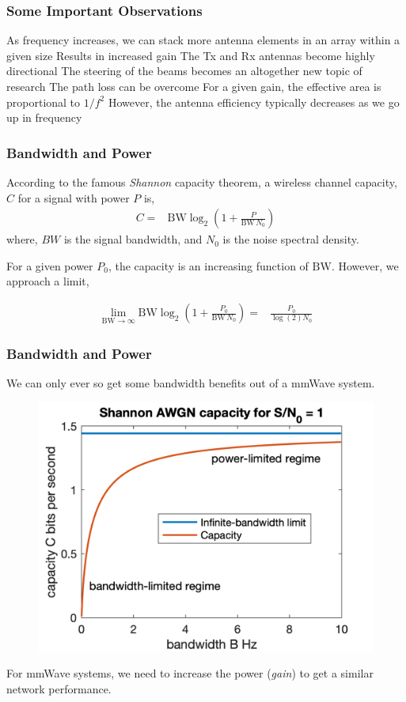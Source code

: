 \documentclass[10pt]{beamer}
\begin{document}
\begin{frame}
    \frametitle{Some Important Observations}
    \begin{outline}
        \1 As frequency increases, we can stack more antenna elements in an array within a given size
        \2 Results in increased gain
        \1 The Tx and Rx antennas become highly directional
        \2 The steering of the beams becomes an altogether new topic of research
        \2 The path loss can be overcome
        \1 For a given gain, the effective area is proportional to $1/f^2$
        \1 However, the antenna efficiency typically decreases as we go up in frequency
    \end{outline}
\end{frame}


\begin{frame}
    \frametitle{Bandwidth and Power}

    According to the famous \textit{Shannon} capacity theorem, a wireless channel capacity, $C$ for a signal with power $P$ is,
    \begin{align*}
        C {}= & \text{BW} \log _{2}\left(1+\frac{P}{\text{BW} \, N_0}\right)
    \end{align*}
    where, $BW$ is the signal bandwidth, and $N_0$ is the noise spectral density.

    \begin{outline}
        \1 For a given power $P_0$, the capacity is an increasing function of $\text{BW}$.
        \1 However, we approach a limit,
    \end{outline}
    \begin{align*}
        \lim_{\text{BW} \rightarrow \infty} \text{BW} \log_{2}\left(1+\frac{P_0}{\text{BW} \,  N_{0}}\right) {}= & \frac{P_0}{\log (2) N_{0}}
    \end{align*}
\end{frame}

\begin{frame}
    \frametitle{Bandwidth and Power}
    We can only ever so get some bandwidth benefits out of a mmWave system.
    \begin{figure}[htbp]
        \centering
        \includegraphics[width=.5\textwidth]{Channel_Capacity_with_Power-_and_Bandwidth-Limited_Regimes.png}
    \end{figure}
    \begin{tcolorbox}[colback=blue!5]
        For mmWave systems, we need to increase the power (\textit{gain}) to get a similar network performance.
    \end{tcolorbox}
\end{frame}
\end{document}
